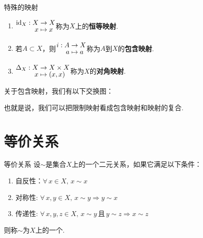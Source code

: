 \begin{definition}{特殊的映射}
    \begin{enumerate}
        \item ${\setjot[-2]\begin{aligned}
            \mathrm{id}_X: X &\to X \\
            x &\mapsto x
        \end{aligned}}$称为$X$上的\textbf{恒等映射}.
        \item 若$A\subset X$，则${\setjot[-2]\begin{aligned}
            i:A &\to X \\
            a &\mapsto a
        \end{aligned}}$称为$A$到$X$的\textbf{包含映射}.
        \item $\setjot[-2]\begin{aligned}
            \Delta_X:X &\to X\times X \\
            x &\mapsto (x,x)
        \end{aligned}$称为$X$的\textbf{对角映射}.
    \end{enumerate}
\end{definition}

\begin{remark}
    关于包含映射，我们有以下交换图： \par
    \par

也就是说，我们可以把限制映射看成包含映射和映射的复合.

\end{remark}

\section{等价关系}

\begin{definition}{等价关系}
    设$\sim$是集合$X$上的一个二元关系，如果它满足以下条件：
    \begin{enumerate}
        \item 自反性：$\forall\, x\in X,\,x\sim x$
        \item 对称性: $\forall\, x,y\in X,\,x\sim y\Rightarrow y\sim x$
        \item 传递性: $\forall\, x,y,z\in X,\,x\sim y\,\text{且}\,y\sim z\Rightarrow x\sim z$
    \end{enumerate}
    则称$\sim$为$X$上的一个.
\end{definition}

